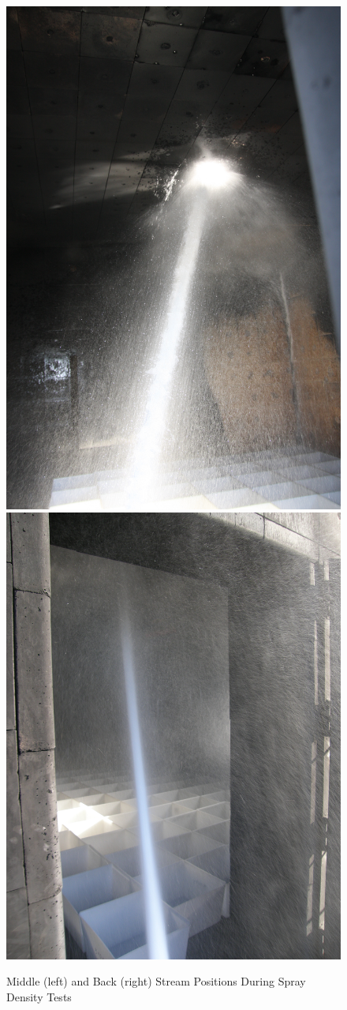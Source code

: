 \documentclass[12pt,oneside]{book}
\begin{document}
\begin{figure}[!ht]
	\includegraphics[width=.4\columnwidth]{../Figures/Pictures/Straight_Mid_BB}
	\includegraphics[width=.4\columnwidth]{../Figures/Pictures/Straight_Back_BB}
	\caption[Middle and Back Stream Positions During Spray Density Tests]{Middle (left) and Back (right) Stream Positions During Spray Density Tests}
	\label{fig:stream_position}
\end{figure}
\end{document}
